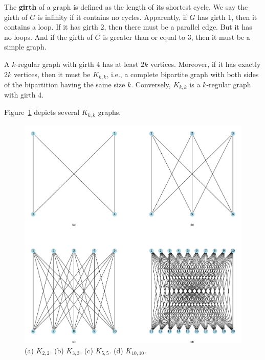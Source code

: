\documentclass[thmcnt=section, 12pt, color=cyan]{my-elegantbook}
\begin{document}

\begin{theorem} \label{thm:1}
\end{theorem}


The \textbf{girth} of a graph is defined as 
the length of its shortest cycle.
We say the girth of $G$ is infinity if it contains no cycles.
Apparently, if $G$ has girth 1, then it contains a loop.
If it has girth 2, then there must be a parallel edge. 
But it has no loops.
And if the girth of $G$ is greater than or equal to 3,
then it must be a simple graph.

\begin{proposition}\label{pro:3}
	A $k$-regular graph with girth 4 has at least $2k$ vertices.
	Moreover, if it has exactly  $2k$ vertices, 
	then it must be $K_{k,k}$, i.e.,
	a complete bipartite graph with both sides of 
	the bipartition having the same size $k$.
	Conversely, $K_{k,k}$ is a $k$-regular graph with girth 4.
\end{proposition}

Figure~\ref{fig:3} depicts several $K_{k,k}$ graphs.

\begin{figure}[ht]
    \centering
    \includegraphics[scale=0.5]{figures/g-003.png}
	\caption{(a) $K_{2,2}$. (b) $K_{3,3}$. (c)  $K_{5,5}$. 
	(d)  $K_{10,10}$.}
    \label{fig:3}
\end{figure}
\end{document}
